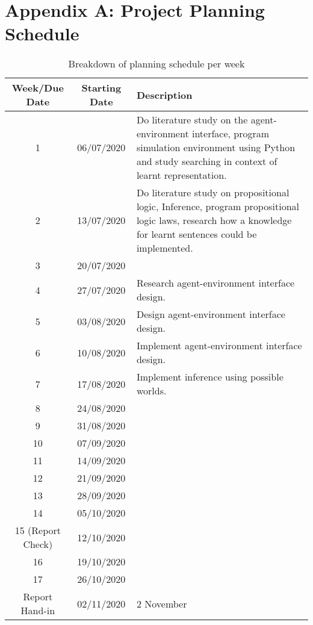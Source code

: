 \setcounter{table}{0}
\renewcommand{\thetable}{A.\arabic{table}}




\chapter{Appendix A:  Project Planning Schedule}

 \begin{table}[H]
  \begin{center}
    \begin{tabular}{|c|c|p{6cm}|} %
    \hline
      \textbf{Week/Due Date} & \textbf{Starting Date} & \textbf{Description}\\
      \hline
      \hline
      1 & 06/07/2020 & Do literature study on the agent-environment interface, program simulation environment using Python and study searching in context of learnt representation.\\ \hline
      2 & 13/07/2020 & Do literature study on propositional logic, Inference, program propositional logic laws, research how a knowledge for learnt sentences could be implemented.\\ \hline
      3 & 20/07/2020 & \\ \hline
      4 & 27/07/2020 &  Research agent-environment interface design. \\ \hline
      5  & 03/08/2020 & Design agent-environment interface design.  \\ \hline
      6 & 10/08/2020 & Implement agent-environment interface design.\\ \hline
      7 & 17/08/2020 & Implement inference using possible worlds. \\ \hline
      8 & 24/08/2020 & \\ \hline
      9 & 31/08/2020 & \\ \hline
      10 & 07/09/2020 &\\ \hline
      11 & 14/09/2020 & \\ \hline
      12 & 21/09/2020 & \\ \hline
      13 & 28/09/2020 & \\ \hline
      14 & 05/10/2020 & \\ \hline
      15 (Report Check) & 12/10/2020 & \\ \hline
      16 & 19/10/2020 & \\ \hline
      17 & 26/10/2020 & \\ \hline
      Report Hand-in & 02/11/2020 &  2 November\\ 
      
      \hline
    \end{tabular}
  \end{center}
  \caption{Breakdown of planning schedule per week}
    \label{tab:tablea1}
\end{table}